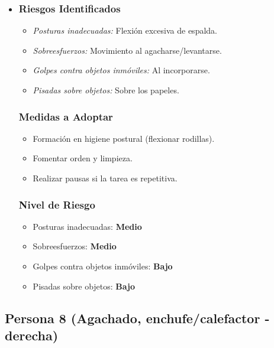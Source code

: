 \documentclass[12pt,a4paper]{article}
\begin{document}
	\begin{itemize}
		\item \subsubsection{Riesgos Identificados}
		\begin{itemize}
			\item \textit{Posturas inadecuadas:} Flexión excesiva de espalda.
			\item \textit{Sobreesfuerzos:} Movimiento al agacharse/levantarse.
			\item \textit{Golpes contra objetos inmóviles:} Al incorporarse.
			\item \textit{Pisadas sobre objetos:} Sobre los papeles.
		\end{itemize}
		\subsubsection{Medidas a Adoptar}
		\begin{itemize}
			\item Formación en higiene postural (flexionar rodillas).
			\item Fomentar orden y limpieza.
			\item Realizar pausas si la tarea es repetitiva.
		\end{itemize}
		\subsubsection{Nivel de Riesgo}
		\begin{itemize}
			\item Posturas inadecuadas: \textbf{Medio}
			\item Sobreesfuerzos: \textbf{Medio}
			\item Golpes contra objetos inmóviles: \textbf{Bajo}
			\item Pisadas sobre objetos: \textbf{Bajo}
		\end{itemize}
	\end{itemize}
	
	\hrulefill
	
	\subsection{Persona 8 (Agachado, enchufe/calefactor - derecha)}
	\label{subsec:persona8} %
	
\end{document}
